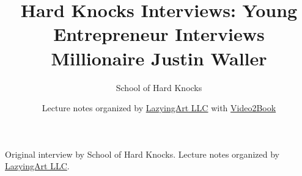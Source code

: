 \documentclass[11pt,oneside]{book}
\begin{document}
\frontmatter
\title{Hard Knocks Interviews: Young Entrepreneur Interviews Millionaire Justin Waller}
\author{School of Hard Knocks}
\date{Lecture notes organized by \href{https://lazying.art}{LazyingArt LLC} with \href{https://github.com/lachlanchen/Video2Book}{Video2Book}}
\maketitle
\begin{center}
\small Original interview by School of Hard Knocks. Lecture notes organized by \href{https://lazying.art}{LazyingArt LLC}.
\end{center}
\clearpage
\mainmatter

\end{document}
